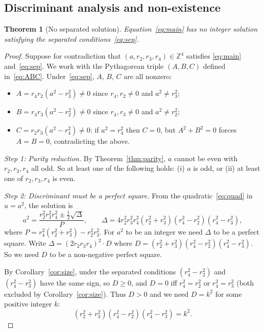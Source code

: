 \documentclass[12pt, a4paper]{article}
\newtheorem{theorem}{Theorem}[section]
\theoremstyle{definition}
\newcommand{\Z}{\mathbb{Z}}
\begin{document}
\subsection{Discriminant analysis and non-existence}

\begin{theorem}[No separated solution]\label{thm:main}
  Equation~\eqref{eq:main} has no integer solution satisfying the separated
  conditions~\eqref{eq:sep}.
\end{theorem}

\begin{proof}
  Suppose for contradiction that $(a, r_2, r_3, r_4) \in \Z^4$ satisfies
  \eqref{eq:main} and~\eqref{eq:sep}.  We work with the Pythagorean triple
  $(A, B, C)$ defined in~\eqref{eq:ABC}.  Under~\eqref{eq:sep}, $A$, $B$,
  $C$ are all nonzero:
  \begin{itemize}[leftmargin=1.5em]
    \item $A = r_4 r_2(a^2-r_3^2) \neq 0$ since $r_4, r_2 \neq 0$ and
      $a^2 \neq r_3^2$;
    \item $B = r_4 r_3(a^2-r_2^2) \neq 0$ since $r_4, r_3 \neq 0$ and
      $a^2 \neq r_2^2$;
    \item $C = r_2 r_3(a^2-r_4^2) \neq 0$: if $a^2 = r_4^2$ then $C = 0$,
      but $A^2+B^2 = 0$ forces $A = B = 0$, contradicting the above.
  \end{itemize}

  \medskip\noindent\textit{Step 1: Parity reduction.}
  By Theorem~\ref{thm:parity}, $a$ cannot be even with $r_2, r_3, r_4$ all
  odd.  So at least one of the following holds:
  (i) $a$ is odd, or (ii) at least one of $r_2, r_3, r_4$ is even.

  \medskip\noindent\textit{Step 2: Discriminant must be a perfect square.}
  From the quadratic~\eqref{eq:quad} in $u = a^2$, the solution is
  \[
    a^2 = \frac{r_2^2r_3^2r_4^2 \pm \frac12\sqrt{\Delta}}{P},
    \qquad \Delta = 4r_2^2r_3^2r_4^2(r_2^2+r_3^2)(r_4^2-r_2^2)(r_4^2-r_3^2),
  \]
  where $P = r_4^2(r_2^2+r_3^2)-r_2^2r_3^2$.
  For $a^2$ to be an integer we need $\Delta$ to be a perfect square.
  Write $\Delta = (2r_2r_3r_4)^2 \cdot D$ where
  $D = (r_2^2+r_3^2)(r_4^2-r_2^2)(r_4^2-r_3^2)$.
  So we need $D$ to be a non-negative perfect square.

  \medskip\noindent By Corollary~\ref{cor:size}, under the separated conditions
  $(r_4^2-r_2^2)$ and $(r_4^2-r_3^2)$ have the same sign, so $D \geq 0$, and
  $D = 0$ iff $r_4^2 = r_2^2$ or $r_4^2 = r_3^2$ (both excluded by
  Corollary~\ref{cor:size}).  Thus $D > 0$ and we need $D = k^2$ for some
  positive integer $k$:
  \begin{equation}\label{eq:Dsq}
    (r_2^2+r_3^2)(r_4^2-r_2^2)(r_4^2-r_3^2) = k^2.
  \end{equation}


\end{proof}
\end{document}
